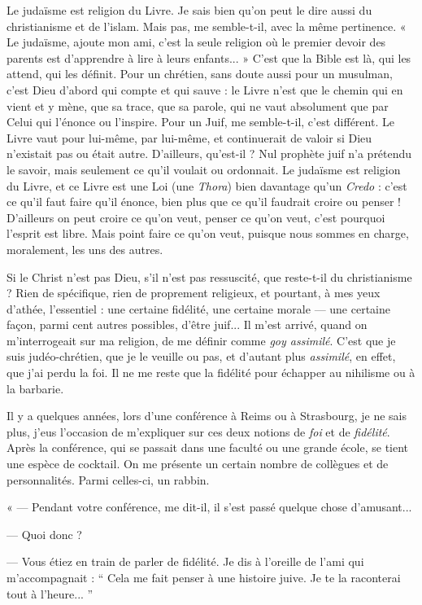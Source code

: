 {Le judaïsme est religion du Livre. Je sais bien qu’on peut le dire aussi du
christianisme et de l’islam. Mais pas, me semble-t-il, avec la même pertinence.
« Le judaïsme, ajoute mon ami, c’est la seule religion où le premier devoir des
parents est d’apprendre à lire à leurs enfants... » C’est que la Bible est là, qui
les attend, qui les définit. Pour un chrétien, sans doute aussi pour un
musulman, c’est Dieu d’abord qui compte et qui sauve : le Livre n’est que le
chemin qui en vient et y mène, que sa trace, que sa parole, qui ne vaut absolument
que par Celui qui l’énonce ou l’inspire. Pour un Juif, me semble-t-il, c’est
différent. Le Livre vaut pour lui-même, par lui-même, et continuerait de valoir
si Dieu n'existait pas ou était autre. D’ailleurs, qu’est-il ? Nul prophète juif n’a
prétendu le savoir, mais seulement ce qu’il voulait ou ordonnait. Le judaïsme
est religion du Livre, et ce Livre est une Loi (une {\it Thora}) bien davantage qu’un
{\it Credo} : c’est ce qu’il faut faire qu’il énonce, bien plus que ce qu’il faudrait
croire ou penser ! D'ailleurs on peut croire ce qu’on veut, penser ce qu’on veut,
c'est pourquoi l'esprit est libre. Mais point faire ce qu’on veut, puisque nous
sommes en charge, moralement, les uns des autres.

Si le Christ n’est pas Dieu, s’il n’est pas ressuscité, que reste-t-il du
christianisme ? Rien de spécifique, rien de proprement religieux, et pourtant, à
mes yeux d’athée, l’essentiel : une certaine fidélité, une certaine morale — une
certaine façon, parmi cent autres possibles, d’être juif... Il m’est arrivé, quand
on m'interrogeait sur ma religion, de me définir comme {\it goy assimilé}. C’est que
je suis judéo-chrétien, que je le veuille ou pas, et d’autant plus {\it assimilé}, en effet,
que j'ai perdu la foi. Il ne me reste que la fidélité pour échapper au nihilisme
ou à la barbarie.

Il y a quelques années, lors d’une conférence à Reims ou à Strasbourg, je ne
sais plus, j’eus l’occasion de m'expliquer sur ces deux notions de {\it foi} et de {\it fidélité}.
Après la conférence, qui se passait dans une faculté ou une grande école, se
tient une espèce de cocktail. On me présente un certain nombre de collègues et
de personnalités. Parmi celles-ci, un rabbin.

« — Pendant votre conférence, me dit-il, il s’est passé quelque chose d’amusant...

— Quoi donc ?

— Vous étiez en train de parler de fidélité. Je dis à l’oreille de l'ami qui
m'accompagnait : “ Cela me fait penser à une histoire juive. Je te la raconterai
tout à l’heure... ”

}
